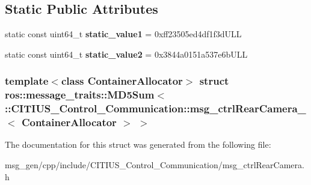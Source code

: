 \subsection*{\-Static \-Public \-Attributes}
\begin{DoxyCompactItemize}
\item 
\hypertarget{structros_1_1message__traits_1_1_m_d5_sum_3_01_1_1_c_i_t_i_u_s___control___communication_1_1msg_aca767840f69c3eb335ebacf2642e346_a6e2ad13db8c320413e674db95d928e5c}{static const uint64\-\_\-t {\bfseries static\-\_\-value1} = 0xff23505ed4df1f3d\-U\-L\-L}\label{structros_1_1message__traits_1_1_m_d5_sum_3_01_1_1_c_i_t_i_u_s___control___communication_1_1msg_aca767840f69c3eb335ebacf2642e346_a6e2ad13db8c320413e674db95d928e5c}

\item 
\hypertarget{structros_1_1message__traits_1_1_m_d5_sum_3_01_1_1_c_i_t_i_u_s___control___communication_1_1msg_aca767840f69c3eb335ebacf2642e346_a7d1455dda8a79b9340fb68bae1246ae4}{static const uint64\-\_\-t {\bfseries static\-\_\-value2} = 0x3844a0151a537e6b\-U\-L\-L}\label{structros_1_1message__traits_1_1_m_d5_sum_3_01_1_1_c_i_t_i_u_s___control___communication_1_1msg_aca767840f69c3eb335ebacf2642e346_a7d1455dda8a79b9340fb68bae1246ae4}

\end{DoxyCompactItemize}
\subsubsection*{template$<$class Container\-Allocator$>$ struct ros\-::message\-\_\-traits\-::\-M\-D5\-Sum$<$ \-::\-C\-I\-T\-I\-U\-S\-\_\-\-Control\-\_\-\-Communication\-::msg\-\_\-ctrl\-Rear\-Camera\-\_\-$<$ Container\-Allocator $>$ $>$}



\-The documentation for this struct was generated from the following file\-:\begin{DoxyCompactItemize}
\item 
msg\-\_\-gen/cpp/include/\-C\-I\-T\-I\-U\-S\-\_\-\-Control\-\_\-\-Communication/msg\-\_\-ctrl\-Rear\-Camera.\-h\end{DoxyCompactItemize}
